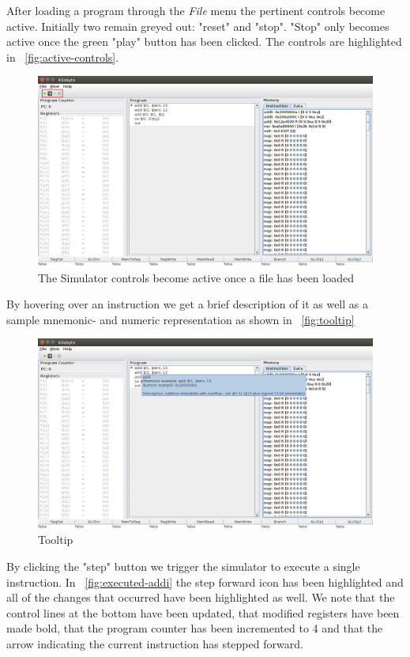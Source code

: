 After loading a program through the \emph{File} menu the pertinent
controls become active. Initially two remain greyed out: "reset" and
"stop". "Stop" only becomes active once the green "play" button has been
clicked. The controls are highlighted in ~\autoref{fig:active-controls}.

\begin{figure}[H]
  \centering
  \includegraphics[width=\textwidth]{images/loaded_sw_controls.png} 
  \caption{The Simulator controls become active once a file has been loaded} 
  \label{fig:active-controls}
\end{figure}

By hovering over an instruction we get a brief description of it as
well as a sample mnemonic- and numeric representation as shown in
~\autoref{fig:tooltip}

\begin{figure}[H]
  \centering
  \includegraphics[width=\textwidth]{images/mouse_over_tooltip.png} 
  \caption{Tooltip} 
  \label{fig:tooltip}
\end{figure}

By clicking the "step" button we trigger the simulator to execute a
single instruction. In ~\autoref{fig:executed-addi} the step forward
icon has been highlighted and all of the changes that occurred have
been highlighted as well. We note that the control lines at the bottom
have been updated, that modified registers have been made bold, that
the program counter has been incremented to 4 and that the arrow
indicating the current instruction has stepped forward.

